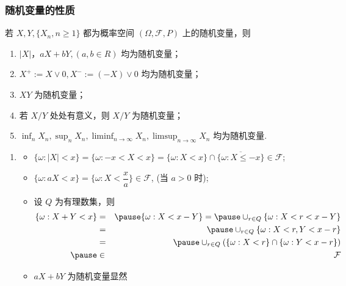 \begin{frame}
	\frametitle{随机变量的性质}
	\begin{thm}
		若 $X,Y, \{X_n,n\ge 1\}$ 都为概率空间 $(\Omega,\mathcal{F},P)$ 上的随机变量，则
		\begin{enumerate}[<+-|alert@+>]
			\item $|X|$，$aX+bY,(a,b\in R)$ 均为随机变量；
			\item $X^+:=X\vee 0, X^-:=(-X)\vee 0$ 均为随机变量；
			\item $XY$ 为随机变量；
			\item 若 $X/Y$ 处处有意义，则 $X/Y$ 为随机变量；
			\item $\inf_{n} X_n,\sup_nX_n, \liminf_{n\rightarrow\infty} X_n, \limsup_{n\rightarrow\infty} X_n$ 均为随机变量.
		\end{enumerate}

	\end{thm}

	\pause
	\zheng
	\begin{enumerate}[<+-|alert@+>]
		\item
		      \begin{itemize}[<+-|alert@+>]
			      \item $\{\omega:|X|<x\}=\{\omega:-x<X<x\}=\{\omega:X<x\}\cap\overline{\{\omega:X\le -x\}}\in \mathcal{F}$;
			      \item  $\{\omega:aX<x\}=\{\omega:X<\dfrac{x}{a}\}\in \mathcal{F}$,  (当 $a>0$ 时);
			      \item  设 $Q$ 为有理数集，则
			            \begin{eqnarray*}
				            \{\omega:X+Y<x\}&=&\pause \{\omega:X<x-Y\}=\pause \cup_{r\in Q}\{\omega:X<r<x-Y\}\\
				            &=&\pause \cup_{r\in Q}\{\omega:X<r,Y<x-r\}\\
				            &=&\pause \cup_{r\in Q}(\{\omega:X<r\}\cap \{\omega:Y<x-r\})\\\pause
				            &\in& \mathcal{F}
			            \end{eqnarray*}
			      \item $aX+bY$ 为随机变量显然
		      \end{itemize}
	\end{enumerate}


\end{frame}
